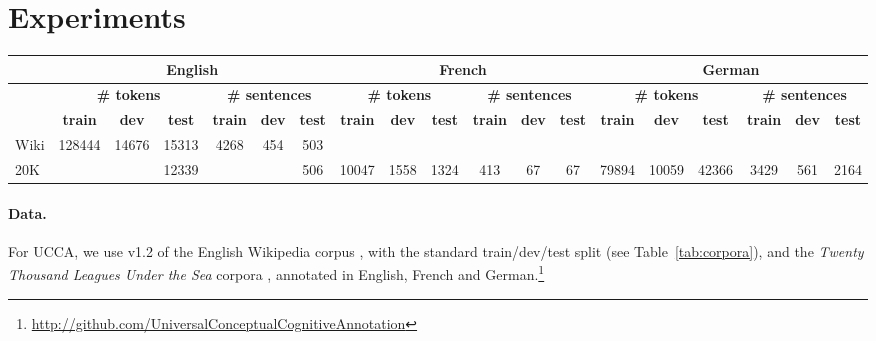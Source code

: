\documentclass[11pt,a4paper]{article}
\begin{document}
\section{Experiments}\label{sec:experiments}

\begin{table*}[t]
\centering
\small
\setlength\tabcolsep{2pt}
\begin{tabular}{l|ccc|ccc||ccc|ccc||ccc|ccc}
& \multicolumn{6}{c||}{\footnotesize \bf English}
& \multicolumn{6}{c||}{\footnotesize \bf French}
& \multicolumn{6}{c}{\footnotesize \bf German} \\
\hline
& \multicolumn{3}{c|}{\footnotesize \bf {\#} tokens}
& \multicolumn{3}{c||}{\footnotesize \bf {\#} sentences}
& \multicolumn{3}{c|}{\footnotesize \bf {\#} tokens}
& \multicolumn{3}{c||}{\footnotesize \bf {\#} sentences}
& \multicolumn{3}{c|}{\footnotesize \bf {\#} tokens}
& \multicolumn{3}{c}{\footnotesize \bf {\#} sentences} \\
& \footnotesize \bf train & \footnotesize \bf dev & \footnotesize \bf test
& \footnotesize \bf train & \footnotesize \bf dev & \footnotesize \bf test
& \footnotesize \bf train & \footnotesize \bf dev & \footnotesize \bf test 
& \footnotesize \bf train & \footnotesize \bf dev & \footnotesize \bf test
& \footnotesize \bf train & \footnotesize \bf dev & \footnotesize \bf test
& \footnotesize \bf train & \footnotesize \bf dev & \footnotesize \bf test \\
\hline
Wiki & 128444 & 14676 & 15313 & 4268 & 454 & 503 &&&&&&&&&&&& \\
20K &&& 12339 &&& 506 & 10047 & 1558 & 1324 & 413 & 67 & 67 & 79894 & 10059 & 42366 & 3429 & 561 & 2164
\end{tabular}
\caption{Number of tokens and sentences in the training, development and test sets
we use for each corpus and language.\label{tab:corpora}}
\end{table*}

\paragraph{Data.}

For UCCA, we use v1.2 of the English Wikipedia corpus \cite{abend2013universal},
with the standard train/dev/test split (see Table~\ref{tab:corpora}),
and the \textit{Twenty Thousand Leagues Under the Sea} corpora
\cite{sulem2015conceptual},
annotated in English, French and German.\footnote{\url{http://github.com/UniversalConceptualCognitiveAnnotation}}
\end{document}
